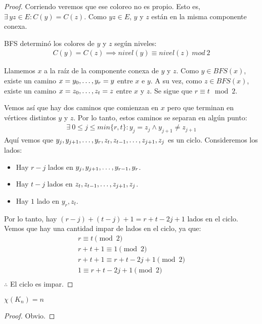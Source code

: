 \begin{proof}
Corriendo  veremos que ese coloreo no es propio. Esto es, $\exists\, yz \in E : C(y) = C(z)$. Como $yz \in E$, $y$ y $z$ están en la misma componente conexa.

BFS determinó los colores de $y$ y $z$ según niveles:
\begin{align}
    C(y) = C(z) \implies nivel(y) \equiv nivel(z)\ mod\ 2
\end{align}

Llamemos $x$ a la raíz de la componente conexa de $y$ y $z$. Como $y \in BFS(x)$, existe un camino $x = y_0, \mathellipsis, y_r = y$ entre $x$ e $y$. A su vez, como $z \in BFS(x)$, existe un camino $x = z_0, \mathellipsis, z_t = z$ entre $x$ y $z$. Se sigue que $r \equiv t \mod{2}$.

Vemos así que hay dos caminos que comienzan en $x$ pero que terminan en vértices distintos $y$ y $z$. Por lo tanto, estos caminos se separan en algún punto:
\begin{align}
    \exists~0 \le j \le min\{r,t\}\colon y_j = z_j \wedge y_{j+1} \neq z_{j+1}
\end{align}
Aquí vemos que $y_j, y_{j+1}, \mathellipsis, y_r, z_t, z_{t-1}, \mathellipsis, z_{j+1}, z_{j}$ es un ciclo.
Consideremos los lados:

\begin{itemize}
    \item Hay $r-j$ lados en $y_j, y_{j+1}, \mathellipsis, y_{r-1}, y_r$.
    \item Hay $t-j$ lados en $z_t, z_{t-1}, \mathellipsis, z_{j+1}, z_j$.
    \item Hay $1$ lado en $y_r,z_t$.
\end{itemize}

Por lo tanto, hay $(r-j)+(t-j)+1 = r+t-2j+1$ lados en el ciclo. Vemos que hay una cantidad impar de lados en el ciclo, ya que:
\begin{align}
    r \equiv t \pmod{2}\\
    r + t + 1 \equiv 1 \pmod{2}\\
    r + t + 1 \equiv r + t - 2j + 1 \pmod 2\\
    1 \equiv r + t - 2j + 1 \pmod 2\\
\end{align}
$\therefore$ El ciclo es impar.
\end{proof}

\begin{proposition}\label{chi_es_completo}
$\chi(K_{n}) = n$
\end{proposition}
\begin{proof}
Obvio.
\end{proof}

